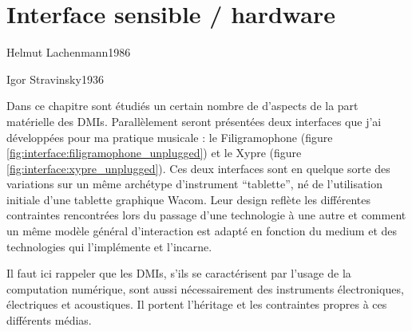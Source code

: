 %
\chapter{Interface sensible / hardware}
\label{ch:interfaces}

{Helmut Lachenmann}{1986}

{Igor Stravinsky}{1936}

\noindent Dans ce chapitre sont étudiés un certain nombre de d'aspects de la part matérielle des \glspl{DMI}. Parallèlement seront présentées deux interfaces que j'ai développées pour ma pratique musicale : le Filigramophone (figure \ref{fig:interface:filigramophone_unplugged}) et le Xypre (figure \ref{fig:interface:xypre_unplugged}). Ces deux interfaces sont en quelque sorte des variations sur un même archétype d'instrument ``tablette'', né de l'utilisation initiale d'une tablette graphique Wacom. Leur design reflète les différentes contraintes rencontrées lors du passage d'une technologie à une autre et comment un même modèle général d'interaction est adapté en fonction du medium et des technologies qui l'implémente et l'incarne.

Il faut ici rappeler que les \glspl{DMI}, s'ils se caractérisent par l'usage de la computation numérique, sont aussi nécessairement des instruments électroniques, électriques et acoustiques. Il portent l'héritage et les contraintes propres à ces différents médias.


